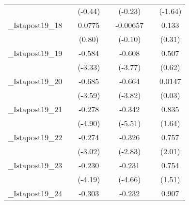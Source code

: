 {\begin{tabular}{l*{6}{c}}
            &                     &     (-0.44)         &                     &     (-0.23)         &                     &     (-1.64)         \\
[1em]
\_Istapost19\_18&                     &      0.0775         &                     &    -0.00657         &                     &       0.133         \\
            &                     &      (0.80)         &                     &     (-0.10)         &                     &      (0.31)         \\
[1em]
\_Istapost19\_19&                     &      -0.584\sym{**} &                     &      -0.608\sym{***}&                     &       0.507         \\
            &                     &     (-3.33)         &                     &     (-3.77)         &                     &      (0.62)         \\
[1em]
\_Istapost19\_20&                     &      -0.685\sym{***}&                     &      -0.664\sym{***}&                     &      0.0147         \\
            &                     &     (-3.59)         &                     &     (-3.82)         &                     &      (0.03)         \\
[1em]
\_Istapost19\_21&                     &      -0.278\sym{***}&                     &      -0.342\sym{***}&                     &       0.835         \\
            &                     &     (-4.90)         &                     &     (-5.51)         &                     &      (1.64)         \\
[1em]
\_Istapost19\_22&                     &      -0.274\sym{**} &                     &      -0.326\sym{**} &                     &       0.757         \\
            &                     &     (-3.02)         &                     &     (-2.83)         &                     &      (2.01)         \\
[1em]
\_Istapost19\_23&                     &      -0.230\sym{***}&                     &      -0.231\sym{***}&                     &       0.754         \\
            &                     &     (-4.19)         &                     &     (-4.66)         &                     &      (1.51)         \\
[1em]
\_Istapost19\_24&                     &      -0.303\sym{**} &                     &      -0.232\sym{**} &                     &       0.907\sym{*}  \\

\end{tabular}}
